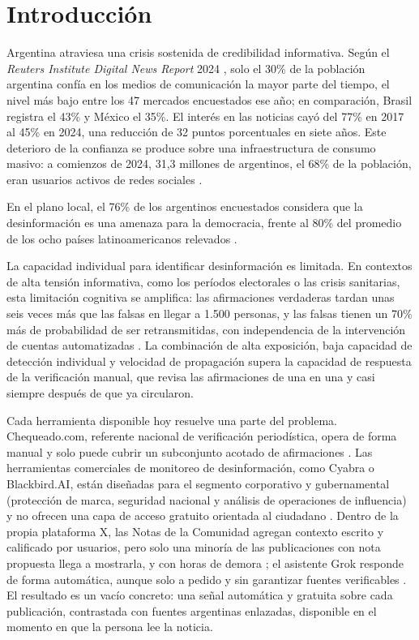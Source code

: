\chapter{Introducción}
\label{ch:introduccion}

Argentina atraviesa una crisis sostenida de credibilidad informativa. Según el \textit{Reuters Institute Digital News Report} 2024 \parencite{Newman2024}, solo el 30\% de la población argentina confía en los medios de comunicación la mayor parte del tiempo, el nivel más bajo entre los 47 mercados encuestados ese año; en comparación, Brasil registra el 43\% y México el 35\%. El interés en las noticias cayó del 77\% en 2017 al 45\% en 2024, una reducción de 32 puntos porcentuales en siete años. Este deterioro de la confianza se produce sobre una infraestructura de consumo masivo: a comienzos de 2024, 31,3 millones de argentinos, el 68\% de la población, eran usuarios activos de redes sociales \parencite{DataReportal2024}.

En el plano local, el 76\% de los argentinos encuestados considera que la desinformación es una amenaza para la democracia, frente al 80\% del promedio de los ocho países latinoamericanos relevados \parencite{ActivaResearch2023}.

La capacidad individual para identificar desinformación es limitada. En contextos de alta tensión informativa, como los períodos electorales o las crisis sanitarias, esta limitación cognitiva se amplifica: las afirmaciones verdaderas tardan unas seis veces más que las falsas en llegar a 1.500 personas, y las falsas tienen un 70\% más de probabilidad de ser retransmitidas, con independencia de la intervención de cuentas automatizadas \parencite{VosoughiEtAl2018}. La combinación de alta exposición, baja capacidad de detección individual y velocidad de propagación supera la capacidad de respuesta de la verificación manual, que revisa las afirmaciones de una en una y casi siempre después de que ya circularon.

Cada herramienta disponible hoy resuelve una parte del problema. Chequeado.com, referente nacional de verificación periodística, opera de forma manual y solo puede cubrir un subconjunto acotado de afirmaciones \parencite{Chequeado2026}. Las herramientas comerciales de monitoreo de desinformación, como Cyabra o Blackbird.AI, están diseñadas para el segmento corporativo y gubernamental (protección de marca, seguridad nacional y análisis de operaciones de influencia) y no ofrecen una capa de acceso gratuito orientada al ciudadano \parencite{Cyabra2026,BlackbirdAI2026}. Dentro de la propia plataforma X, las Notas de la Comunidad agregan contexto escrito y calificado por usuarios, pero solo una minoría de las publicaciones con nota propuesta llega a mostrarla, y con horas de demora \parencite{SlaughterEtAl2025}; el asistente Grok responde de forma automática, aunque solo a pedido y sin garantizar fuentes verificables \parencite{JazwinskaChandrasekar2025}. El resultado es un vacío concreto: una señal automática y gratuita sobre cada publicación, contrastada con fuentes argentinas enlazadas, disponible en el momento en que la persona lee la noticia.

